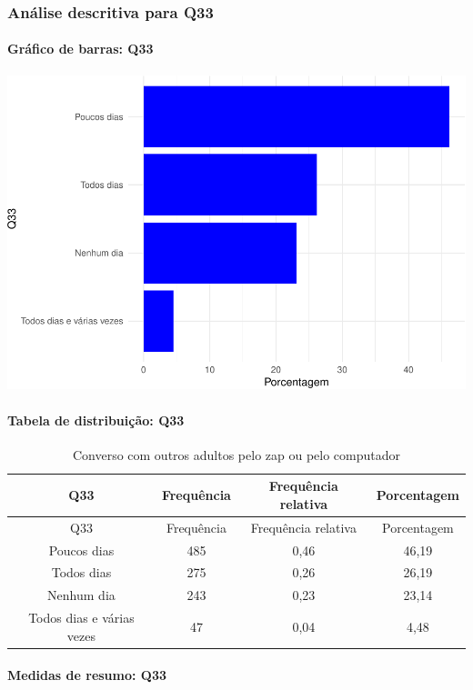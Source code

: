 \documentclass[]{article}
\let\oldparagraph\paragraph
\renewcommand{\paragraph}[1]{\oldparagraph{#1}\mbox{}}
\begin{document}
\hypertarget{anuxe1lise-descritiva-para-q33}{%
\subsubsection{Análise descritiva para Q33}\label{anuxe1lise-descritiva-para-q33}}

\hypertarget{gruxe1fico-de-barras-q33}{%
\paragraph{Gráfico de barras: Q33}\label{gruxe1fico-de-barras-q33}}

\begin{center}\includegraphics[width=0.75\linewidth]{relatorio_covid19_files/figure-latex/unnamed-chunk-1130-1} \end{center}

\hypertarget{tabela-de-distribuiuxe7uxe3o-q33}{%
\paragraph{Tabela de distribuição: Q33}\label{tabela-de-distribuiuxe7uxe3o-q33}}

\begin{longtable}[]{@{}cccc@{}}
\caption{\label{tab:unnamed-chunk-1131}Converso com outros adultos pelo zap ou pelo computador}\tabularnewline
\toprule
Q33 & Frequência & Frequência relativa & Porcentagem\tabularnewline
\midrule
\endfirsthead
\toprule
Q33 & Frequência & Frequência relativa & Porcentagem\tabularnewline
\midrule
\endhead
Poucos dias & 485 & 0,46 & 46,19\tabularnewline
Todos dias & 275 & 0,26 & 26,19\tabularnewline
Nenhum dia & 243 & 0,23 & 23,14\tabularnewline
Todos dias e várias vezes & 47 & 0,04 & 4,48\tabularnewline
\bottomrule
\end{longtable}

\hypertarget{medidas-de-resumo-q33}{%
\paragraph{Medidas de resumo: Q33}\label{medidas-de-resumo-q33}}
\end{document}

